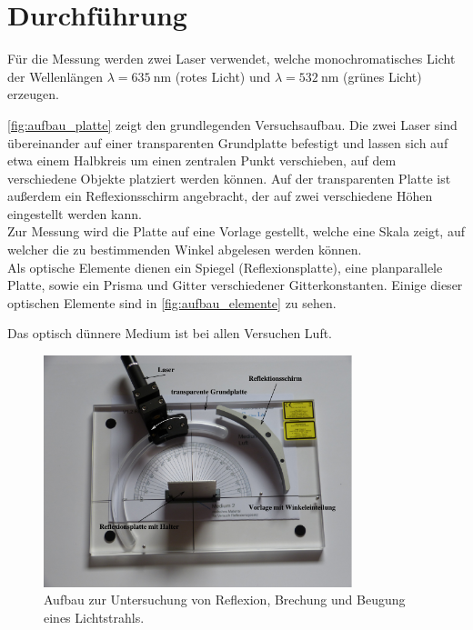 \section{Durchführung}

    Für die Messung werden zwei Laser verwendet,
    welche monochromatisches Licht der Wellenlängen
    $\lambda = \SI{635}{\nano\meter}$ (rotes Licht) und
    $\lambda = \SI{532}{\nano\meter}$ (grünes Licht)
    erzeugen.


    \autoref{fig:aufbau_platte} zeigt den grundlegenden Versuchsaufbau.
    Die zwei Laser sind übereinander auf einer transparenten Grundplatte befestigt
    und lassen sich auf etwa einem Halbkreis um einen zentralen Punkt verschieben,
    auf dem verschiedene Objekte platziert werden können.
    Auf der transparenten Platte ist außerdem ein Reflexionsschirm angebracht,
    der auf zwei verschiedene Höhen eingestellt werden kann.\\
    Zur Messung wird die Platte auf eine Vorlage gestellt,
    welche eine Skala zeigt,
    auf welcher die zu bestimmenden Winkel abgelesen werden können.\\
    Als optische Elemente dienen ein Spiegel (Reflexionsplatte),
    eine planparallele Platte, sowie ein Prisma und Gitter verschiedener Gitterkonstanten.
    Einige dieser optischen Elemente sind in \autoref{fig:aufbau_elemente} zu sehen.

    Das optisch dünnere Medium ist bei allen Versuchen Luft.

    \begin{figure}
      \centering
      \includegraphics[width=0.8\textwidth]{content/img/Abb_3_compressed.pdf}
      \caption{Aufbau zur Untersuchung von Reflexion, Brechung und Beugung eines Lichtstrahls. \cite{versuchsanleitung}}
      \label{fig:aufbau_platte}
    \end{figure}

